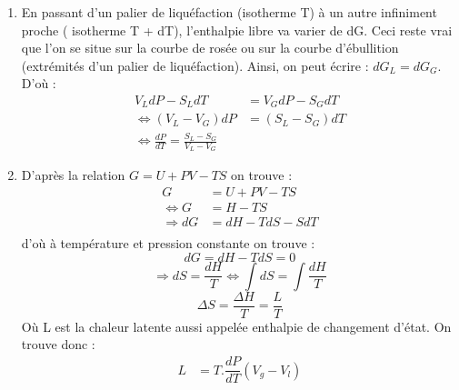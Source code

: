\documentclass[12pt,a4paper]{article}
\begin{document}
\begin{enumerate}
\item En passant d'un palier de liquéfaction (isotherme T) à un autre infiniment proche ( isotherme T + dT), l'enthalpie libre va varier de dG. Ceci reste vrai que l'on se situe sur la courbe de rosée ou sur la courbe d'ébullition (extrémités d'un palier de liquéfaction). Ainsi, on peut écrire : $dG_L = dG_G$.
 D'où : 
\begin{align*}
V_LdP - S_LdT &= V_GdP - S_GdT\\
\Leftrightarrow \left( V_L - V_G \right)dP &= \left(S_L - S_G \right)dT\\
\Leftrightarrow \boxed{\frac{dP}{dT} = \frac{S_L - S_G}{V_L - V_G}}
\end{align*} 
\item D'après la relation $G = U + PV - TS$ on trouve :\\
\begin{align*}
G &= U + PV - TS\\
\Leftrightarrow G &= H - TS \\
\Rightarrow dG &= dH -TdS - SdT\\
\end{align*}
d'où à température et pression constante on trouve :
$$ dG = dH - TdS = 0 $$
$$ \Rightarrow dS = \frac{dH}{T} \Leftrightarrow \int dS = \int \frac{dH}{T}$$
$$\boxed{ \Delta S = \frac{\Delta H}{T} = \frac{L}{T}}$$
Où L est la chaleur latente aussi appelée enthalpie de changement d'état. On trouve donc : \\
\begin{align}
L&=T.\dfrac{dP}{dT}(V_g - V_l)
\end{align}
\end{enumerate}
\end{document}
